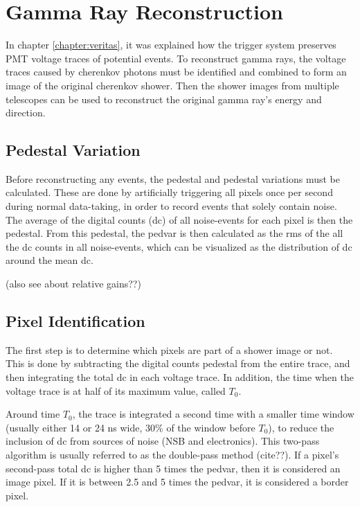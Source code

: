 \cleartooddpage[\thispagestyle{empty}]
\chapter{Gamma Ray Reconstruction}\label{ch:grrecon}

In chapter \ref{chapter:veritas}, it was explained how the trigger system preserves PMT voltage traces of potential events.
To reconstruct gamma rays, the voltage traces caused by cherenkov photons must be identified and combined to form an image of the original cherenkov shower.
Then the shower images from multiple telescopes can be used to reconstruct the original gamma ray's energy and direction.

\section{Pedestal Variation}
Before reconstructing any events, the pedestal and pedestal variations must be calculated.
These are done by artificially triggering all pixels once per second during normal data-taking, in order to record events that solely contain noise.
The average of the digital counts (dc) of all noise-events for each pixel is then the pedestal.
From this pedestal, the pedvar is then calculated as the rms of the all the dc counts in all noise-events, which can be visualized as the distribution of dc around the mean dc.

(also see \cite{Hanna2010NIM} about relative gains??)

\section{Pixel Identification}
The first step is to determine which pixels are part of a shower image or not.
This is done by subtracting the digital counts pedestal from the entire trace, and then integrating the total dc in each voltage trace.
In addition, the time when the voltage trace is at half of its maximum value, called $T_{0}$.

Around time $T_{0}$, the trace is integrated a second time with a smaller time window (usually either 14 or 24 ns wide, 30\% of the window before $T_0$), to reduce the inclusion of dc from sources of noise (NSB and electronics).
This two-pass algorithm is usually referred to as the double-pass method (cite??).
If a pixel's second-pass total dc is higher than 5 times the pedvar, then it is considered an image pixel.
If it is between 2.5 and 5 times the pedvar, it is considered a border pixel.

